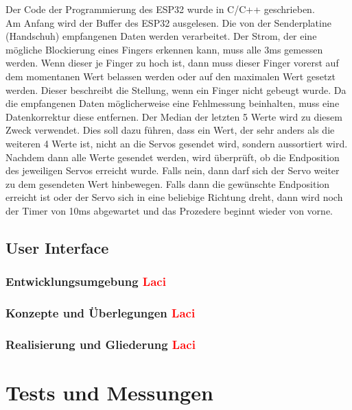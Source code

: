 \documentclass[11pt]{article}
\begin{document}
Der Code der Programmierung des ESP32 wurde in C/C++ geschrieben. \\
Am Anfang wird der Buffer des ESP32 ausgelesen. Die von der Senderplatine (Handschuh) empfangenen Daten werden verarbeitet. 
Der Strom, der eine mögliche Blockierung eines Fingers erkennen kann, muss alle 3ms gemessen werden. Wenn dieser je Finger zu 
hoch ist, dann muss dieser Finger vorerst auf dem momentanen Wert belassen werden oder auf den maximalen Wert gesetzt werden. 
Dieser beschreibt die Stellung, wenn ein Finger nicht gebeugt wurde. Da die empfangenen Daten möglicherweise eine Fehlmessung 
beinhalten, muss eine Datenkorrektur diese entfernen. Der Median der letzten 5 Werte wird zu diesem Zweck verwendet. Dies soll 
dazu führen, dass ein Wert, der sehr anders als die weiteren 4 Werte ist, nicht an die Servos gesendet wird, sondern aussortiert 
wird. Nachdem dann alle Werte gesendet werden, wird überprüft, ob die Endposition des jeweiligen Servos erreicht wurde. Falls 
nein, dann darf sich der Servo weiter zu dem gesendeten Wert hinbewegen. Falls dann die gewünschte Endposition erreicht ist 
oder der Servo sich in eine beliebige Richtung dreht, dann wird noch der Timer von 10ms abgewartet und das Prozedere beginnt 
wieder von vorne.
\\

\subsection{User Interface}
\subsubsection{Entwicklungsumgebung \textcolor{red}{Laci}}
\subsubsection{Konzepte und Überlegungen \textcolor{red}{Laci}}
\subsubsection{Realisierung und Gliederung \textcolor{red}{Laci}}

\section{Tests und Messungen}
\end{document}
